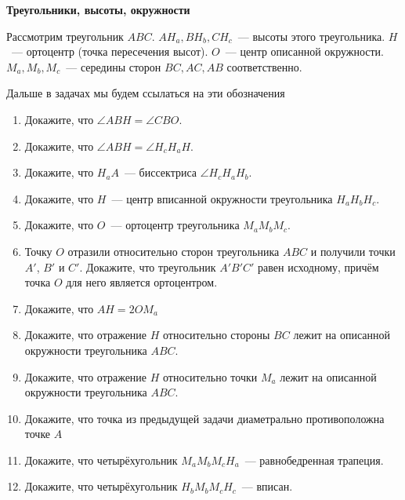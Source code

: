 \documentclass{article}
\begin{document}
\large


\begin{center}
\textbf{Треугольники, высоты, окружности}
\end{center}

Рассмотрим треугольник $ABC$. $AH_a, BH_b, CH_c$~--- высоты этого треугольника. $H$~--- ортоцентр (точка пересечения высот). $O$~--- центр описанной окружности. $M_a, M_b, M_c$~--- середины сторон $BC, AC, AB$ соответственно.

Дальше в задачах мы будем ссылаться на эти обозначения


\begin{enumerate}[label*=\protect\fbox{\arabic{enumi}}]

\item Докажите, что $\angle ABH = \angle CBO$.

\item Докажите, что $\angle ABH = \angle H_cH_aH$.

\item Докажите, что $H_aA$~--- биссектриса $ \angle H_cH_aH_b$.

\item Докажите, что $H$~--- центр вписанной окружности треугольника $H_aH_bH_c$.

\item Докажите, что $O$~--- ортоцентр треугольника $M_aM_bM_c$.


\item Точку $O$ отразили относительно сторон треугольника $ABC$ и получили точки $A'$, $B'$ и $C'$. Докажите, что треугольник $A'B'C'$ равен исходному, причём точка $O$ для него является ортоцентром.

\item Докажите, что  $AH = 2OM_a$

\item Докажите, что отражение  $H$ относительно стороны $BC$ лежит на описанной окружности треугольника $ABC$.

\item Докажите, что отражение  $H$ относительно точки $M_a$ лежит на описанной окружности треугольника $ABC$.

\item Докажите, что точка из предыдущей задачи диаметрально противоположна точке $A$

\item Докажите, что четырёхугольник  $M_aM_bM_cH_a$~--- равнобедренная трапеция.

\item Докажите, что четырёхугольник  $H_bM_bM_cH_c$~--- вписан.


\end{enumerate}
\end{document}
